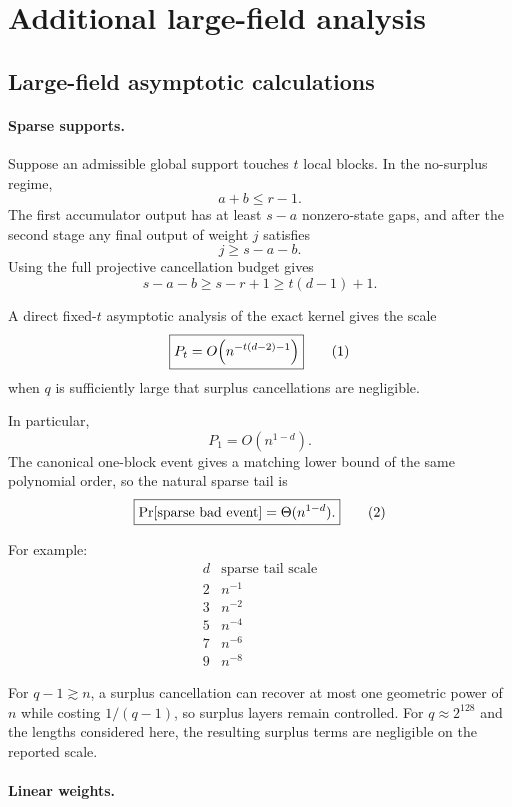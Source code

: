 \section{Additional large-field analysis}

\subsection{Large-field asymptotic calculations}
\label{app:field-asymptotics}

\paragraph{Sparse supports.}

Suppose an admissible global support touches $t$ local blocks.
In the no-surplus regime,
\[
    a+b\le r-1.
\]
The first accumulator output has at least $s-a$ nonzero-state gaps, and after
the second stage any final output of weight $j$ satisfies
\[
    j\ge s-a-b.
\]
Using the full projective cancellation budget gives
\[
    s-a-b\ge s-r+1\ge t(d-1)+1.
\]

A direct fixed-$t$ asymptotic analysis of the exact kernel gives the scale
\[
    \boxed{
    P_t
      =
    O\!\left(
      n^{-t(d-2)-1}
    \right)
    }
    \eqnumlabel{eq:6}
\]
when $q$ is sufficiently large that surplus cancellations are negligible.

In particular,
\[
    P_1=O(n^{1-d}).
\]
The canonical one-block event gives a matching lower bound of the same
polynomial order, so the natural sparse tail is
\[
    \boxed{
    \Prb[\text{sparse bad event}]
      =
    \Theta(n^{1-d}).
    }
    \eqnumlabel{eq:7}
\]

For example:
\[
\begin{array}{c|c}
d & \text{sparse tail scale}\\
\hline
2 & n^{-1}\\
3 & n^{-2}\\
5 & n^{-4}\\
7 & n^{-6}\\
9 & n^{-8}
\end{array}
\]

For $q-1\gtrsim n$, a surplus cancellation can recover at most one geometric
power of $n$ while costing $1/(q-1)$, so surplus layers remain controlled.
For $q\approx2^{128}$ and the lengths considered here, the resulting surplus
terms are negligible on the reported scale.

\paragraph{Linear weights.}

